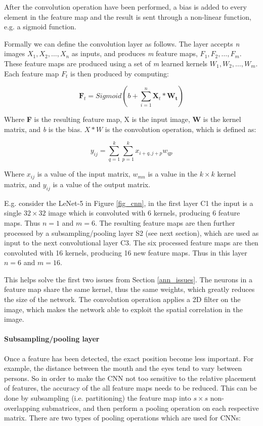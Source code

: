 After the convolution operation have been performed, a bias is added to every element in the feature map and the result is sent through a non-linear function, e.g. a sigmoid function.

Formally we can define the convolution layer as follows. The layer accepts \textit{n} images $ X_1, X_2, \dots, X_n $ as inputs, and produces \textit{m} feature maps, $F_1, F_2, \dots, F_m $. These feature maps are produced using a set of \textit{m} learned kernels $ W_1, W_2, \dots, W_m $.  Each feature map $ F_t $ is then produced by computing:
 

\begin{equation}
\mathbf{F}_t = Sigmoid(b+\sum_{i=1}^{n}\mathbf{X}_t*\mathbf{W_t})
\end{equation}

Where \textbf{F} is the resulting feature map, X is the input image, \textbf{W} is the kernel matrix, and \textit{b} is the bias. $ X * W $ is the convolution operation, which is defined as:

\begin{equation}
y_{ij} = \sum_{q=1}^{k}\sum_{p=1}^{k} x_{i+q, j+p}w_{qp}
\end{equation}

Where $ x_{ij} $ is a value of the input matrix, $ w_{mn} $ is a value in the $ k \times k $ kernel matrix, and $ y_{ij} $ is a value of the output matrix.

E.g. consider the LeNet-5 in Figure \ref{fig_cnn}, in the first layer C1 the input is a single $ 32 \times 32 $ image which is convoluted with 6 kernels, producing 6 feature maps. Thus $ n = 1 $ and $ m = 6 $. The resulting feature maps are then further processed by a subsampling/pooling layer S2 (see next section), which are used as input to the next convolutional layer C3. The six processed feature maps are then convoluted with 16 kernels, producing 16 new feature maps. Thus in this layer $ n = 6 $ and $ m = 16 $. 



This helps solve the first two issues from Section \ref{ann_issues}. The neurons in a feature map share the same kernel, thus the same weights, which greatly reduces the size of the network. The convolution operation applies a 2D filter on the image, which makes the network able to exploit the spatial correlation in the image. 

\paragraph{Subsampling/pooling layer}  \hfill \break
Once a feature has been detected, the exact position become less important. For example, the distance between the mouth and the eyes tend to vary between persons. So in order to make the CNN not too sensitive to the relative placement of features, the accuracy of the all feature maps needs to be reduced. This can be done by subsampling (i.e. partitioning) the feature map into $ s \times s $ non-overlapping submatrices, and then perform a pooling operation on each respective matrix. There are two types of pooling operations which are used for CNNs: 

